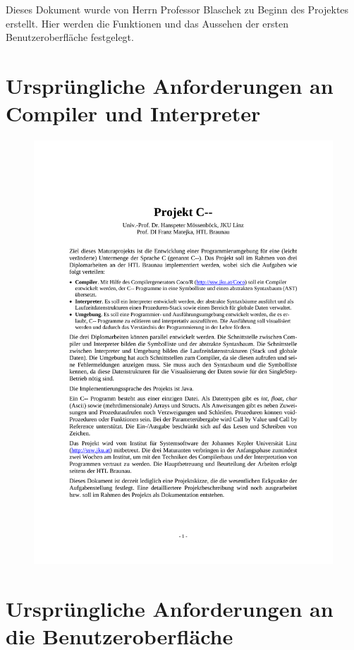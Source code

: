 \documentclass[11pt, oneside]{book}   		%
\begin{document}
Dieses Dokument wurde von Herrn Professor Blaschek zu Beginn des Projektes erstellt. Hier werden die Funktionen und das Aussehen der ersten Benutzeroberfläche festgelegt.

\pagebreak
\section{Ursprüngliche Anforderungen an Compiler und Interpreter}
\label{app:anf-comp}

\begin{figure}[h!]
	\centering
	\includegraphics[width=1.0\textwidth]{./media/docs/Anforderung-compiler.pdf}
\end{figure}



\pagebreak

\section{Ursprüngliche Anforderungen an die Benutzeroberfläche}
\label{app:anf-gui}
\end{document}
